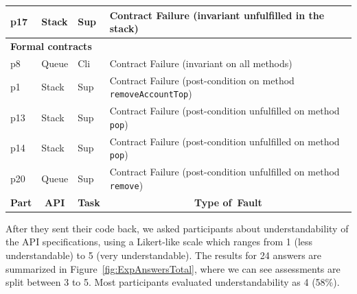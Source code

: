 \begin{table}
\begin{adjustbox}{width=\textwidth}
\begin{tabular}{|l|l|l|l|}
\hline
p17                                        & Stack                             & Sup                                & Contract Failure (invariant unfulfilled in the stack)                                     \\ 
\hline
\multicolumn{4}{|l|}{\textbf{Formal contracts} }                                                                                                                                                                \\ 
\hline
p8                                         & Queue                             & Cli                                & Contract Failure (invariant on all methods)                                               \\ 
\hline
p1                                         & Stack                             & Sup                                & Contract Failure (post-condition on method \texttt{removeAccountTop})    \\ 
\hline
p13                                        & Stack                             & Sup                                & Contract Failure (post-condition unfulfilled on method \texttt{pop})     \\ 
\hline
p14                                        & Stack                             & Sup                                & Contract Failure (post-condition unfulfilled on method \texttt{pop})     \\ 
\hline
p20                                        & Queue                             & Sup                                & Contract Failure (post-condition unfulfilled on method \texttt{remove})  \\ 
\hline\hline
\multicolumn{1}{|c|}{\textbf{Part}} & \multicolumn{1}{c|}{\textbf{API}} & \multicolumn{1}{c|}{\textbf{Task}} & \multicolumn{1}{c|}{\textbf{Type of~Fault}}                                               \\
\hline
\end{tabular}
\end{adjustbox}
\end{table}

After they sent their code back, we asked participants about understandability of the API specifications, using a Likert-like scale which ranges from 1 (less understandable) to 5 (very understandable). The results for 24 answers are summarized in Figure~\ref{fig:ExpAnswersTotal}, where we can see assessments are split between 3 to 5. Most participants evaluated understandability as 4 (58\%).


